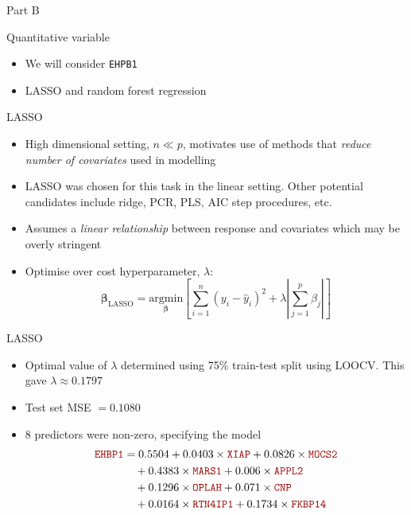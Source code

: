 \documentclass{beamer}
\let\OldTexttt\texttt
\renewcommand{\texttt}[1]{\OldTexttt{{\textcolor{islrred}{#1}}}}
\let\OldTextit\textit
\renewcommand{\textit}[1]{\OldTextit{{\textcolor{islrgreen}{#1}}}}
\begin{document}
\begin{frame}
  \centering
  \Large
  \textcolor{islrblue}{Part B}
\end{frame}

\begin{frame}{Quantitative variable}
  \begin{itemize}
    \item We will consider \texttt{EHPB1}
    \item LASSO and random forest regression
  \end{itemize}
\end{frame}

\begin{frame}{LASSO}
  \begin{itemize}
    \item High dimensional setting, \(n \ll p\), motivates use
      of methods that \textit{reduce number of covariates} used in modelling
    \item LASSO was chosen for this task in the linear setting.
      Other potential candidates include ridge, PCR, PLS, AIC step
      procedures, etc.
    \item Assumes a \textit{linear relationship} between response and 
      covariates which may be overly stringent
    \item Optimise over cost hyperparameter, \(\lambda\):
      \[
        \bm\beta_{\text{LASSO}} = \underset{\bm\beta}{\text{argmin}}
        \left[\sum_{i = 1}^n (y_i - \hat y_i)^2 + \lambda \left|\sum_{j = 1}^p 
        \beta_j\right|\right]
      \]
  \end{itemize}
\end{frame}

\begin{frame}{LASSO}
  \begin{itemize}
    \item Optimal value of \(\lambda\) determined using 75\% train-test split
      using LOOCV. This gave \(\lambda \approx 0.1797\)
    \item Test set MSE \(= 0.1080\)
    \item 8 predictors were non-zero, specifying the model
      \begin{align*}
        \texttt{EHBP1} &= 0.5504 + 0.0403 \times \texttt{XIAP}
                       + 0.0826 \times \texttt{MOCS2} \\
                       &\quad + 0.4383 \times \texttt{MARS1}
                       + 0.006 \times \texttt{APPL2} \\
                       &\quad + 0.1296 \times \texttt{OPLAH}
                       + 0.071 \times \texttt{CNP} \\
                       &\quad + 0.0164 \times \texttt{RTN4IP1}
                       + 0.1734 \times \texttt{FKBP14}
      \end{align*}
  \end{itemize}
\end{frame}
\end{document}
